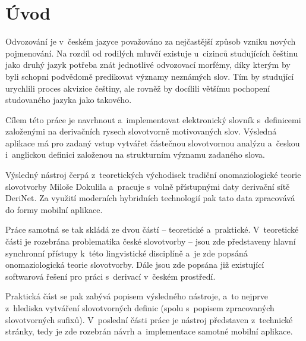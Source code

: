 \hypertarget{uxfavod}{%
\chapter*{Úvod}\label{uvod}
}

Odvozování je v~českém jazyce považováno za nejčastější způsob vzniku
nových pojmenování. Na rozdíl od rodilých mluvčí existuje u~cizinců
studujících češtinu jako druhý jazyk potřeba znát jednotlivé odvozovací
morfémy, díky kterým by byli schopni podvědomě predikovat významy
neznámých slov. Tím by studující urychlili proces akvizice češtiny, ale
rovněž by docílili většímu pochopení studovaného jazyka jako takového.

Cílem této práce je navrhnout a~implementovat elektronický slovník
s~definicemi založenými na derivačních rysech slovotvorně motivovaných
slov. Výsledná aplikace má pro zadaný vstup vytvářet částečnou
slovotvornou analýzu a~českou i~anglickou definici založenou na
strukturním významu zadaného slova.

Výsledný nástroj čerpá z~teoretických východisek tradiční
onomaziologické teorie slovotvorby Miloše Dokulila a~pracuje s~volně
přístupnými daty derivační sítě DeriNet. Za využití moderních hybridních
technologií pak tato data zpracovává do formy mobilní aplikace.

Práce samotná se tak skládá ze dvou částí -- teoretické a~praktické.
V~teoretické části je rozebrána problematika české slovotvorby -- jsou zde
představeny hlavní synchronní přístupy k~této lingvistické disciplíně
a~je zde popsáná onomaziologická teorie slovotvorby. Dále jsou zde popsána
již existující softwarová řešení pro práci s~derivací v~českém
prostředí.

Praktická část se pak zabývá popisem výsledného nástroje, a~to nejprve
z~hlediska vytváření slovotvorných definic (spolu s~popisem zpracovaných
slovotvorných sufixů). V~poslední části práce je nástroj představen
z~technické stránky, tedy je zde rozebrán návrh a~implementace samotné
mobilní aplikace.
